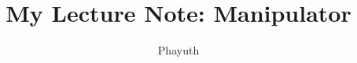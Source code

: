 \documentclass[12pt,a4paper]{book}
\begin{document}
	\title{My Lecture Note: Manipulator}
	\author{Phayuth}
	\maketitle
	
	\tableofcontents

	
	
\end{document}
